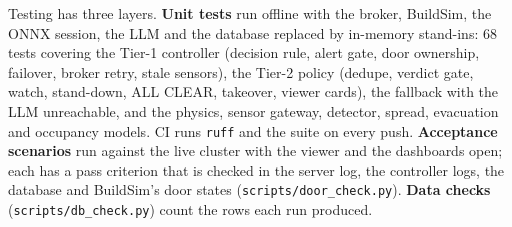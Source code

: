 \documentclass[11pt]{article}
\begin{document}
Testing has three layers. \textbf{Unit tests} run offline with the broker, BuildSim, the ONNX 
session, the LLM and the database replaced by in-memory stand-ins: 68 tests covering the Tier-1 controller 
(decision rule, alert gate, door ownership, failover, broker retry, stale sensors), the Tier-2 
policy (dedupe, verdict gate, watch, stand-down, ALL CLEAR, takeover, viewer cards), the fallback 
with the LLM unreachable, and the physics, sensor gateway, detector, spread, evacuation and occupancy 
models. CI runs \texttt{ruff} and the suite on every push. \textbf{Acceptance scenarios} run 
against the live cluster with the viewer and the dashboards open; each has a pass criterion that 
is checked in the server log, the controller logs, the database and BuildSim's door states 
(\texttt{scripts/door\_check.py}). \textbf{Data checks} (\texttt{scripts/db\_check.py}) count the 
rows each run produced.
\end{document}
